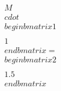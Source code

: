 \documentclass[preview]{standalone}
\begin{document}
\begin{align*}
M \\cdot \\begin{bmatrix} 1 \\\\ 1 \\end{bmatrix} = \\begin{bmatrix} 2 \\\\ 1.5 \\end{bmatrix}
\end{align*}
\end{document}
